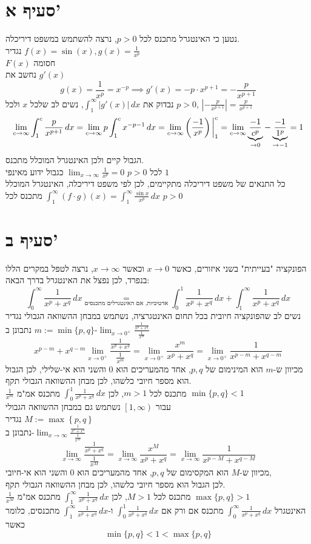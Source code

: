 \documentclass[12pt, titlepage]{article}
\begin{document}
\section*{סעיף א'}
נטען כי האינטגרל מתכנס לכל $p>0$, נרצה להשתמש במשפט דיריכלה.\\
נגדיר $f(x) = \sin(x), g(x) = \frac{1}{x^p}$\\
$F(x)$ חסומה\\
נחשב את $g'(x)$
\[
	g(x) = \frac{1}{x^{p}} = x^{-p} \implies g'(x) = -p\cdot x^{p+1} = -\frac{p}{x^{p+1}}
\]
נבדוק את $\int^\infty_1 \left|g'(x)\right|\,dx$, נשים לב שלכל $x$ ולכל $p>0$, $\left|-\frac{p}{x^{p+1}}\right| = \frac{p}{x^{p+1}}$
\[
	\lim_{c\to\infty} \int_1^c\frac{p}{x^{p+1}}\,dx = \lim_{c\to\infty} p \int^c_1 x^{-p-1} \,dx= \lim_{c\to\infty}  \left(\frac{-1}{x^{p}}\right)\bigg{|}^c_1 = \lim_{c\to\infty} \underbrace{\frac{-1}{c^p}}_{\to 0} - \underbrace{\frac{-1}{1^p}}_{\to -1} = 1
\]
הגבול קיים ולכן האינטגרל המוכלל מתכנס.\\
לכל $p>0$ $\lim_{x\to\infty}\frac{1}{x^{p}}=0$ כגבול ידוע מאינפי $1$\\
כל התנאים של משפט דיריכלה מתקיימים, לכן לפי משפט דיריכלה, האינטגרל המוכלל $\int^\infty_1(f\cdot g)(x)=\int^\infty_1 \frac{\sin x}{x^p}\,dx$ מתכנס לכל $\boxed{p>0}$
\section*{סעיף ב'}
הפונקציה "בעייתית" בשני איזורים, כאשר $x\to 0$ וכאשר $x\to \infty$, נרצה לטפל במקרים הללו בנפרד, לכן נפצל את האינטגרל בדרך הבאה:
\[
	\int_0^\infty \frac{1}{x^p+x^q}\,dx \underset{\text{אדטיביות, אם האינטגרלים מתכנסים}}{=}	\int_0^1 \frac{1}{x^p+x^q}\,dx + 	\int_1^\infty \frac{1}{x^p+x^q}\,dx
\]
נשים לב שהפונקציה חיובית בכל תחום האינטגרציה, נשתמש במבחן ההשוואה הגבולי
נגדיר $m:= \min\{p,q\}$
נתבונן ב-$\lim_{x\to 0^{+}} \frac{\frac{1}{x^p+x^q}}{\frac{1}{x^m}}$
\[
	x^{p-m} + x^{q-m}	\lim_{x\to0^{+}} \frac{\frac{1}{x^p+x^q}}{\frac{1}{x^m}} =\lim_{x\to0^{+}} \frac{x^m}{x^p+x^q} = \lim_{x\to0^+}\frac{1}{x^{p-m} + x^{q-m}}
\]
מכיוון ש-$m$ הוא המינימום של $p,q$, אחד מהמעריכים הוא $0$ והשני הוא אי-שלילי, לכן הגבול הוא מספר חיובי כלשהו, לכן מבחן ההשוואה הגבולי תקף.\\
$\frac{1}{x^m}$ מתכנס לכל $m>1$, לכן $\int_0^1 \frac{1}{x^p+x^q}\,dx$ מתכנס אמ"מ $\min\{p,q\}< 1$\\
עבור $\left[1,\infty\right)$ נשתמש גם במבחן ההשוואה הגבולי\\
נגדיר $M:=\max\left\{p,q\right\}$\\
נתבונן ב-$\lim_{x\to \infty} \frac{\frac{1}{x^p+x^q}}{\frac{1}{x^M}}$
\[
	\lim_{x\to \infty} \frac{\frac{1}{x^p+x^q}}{\frac{1}{x^M}} = \lim_{x\to\infty}\frac{x^M}{x^p+x^q} = \lim_{x\to\infty} \frac{1}{x^{p-M}+x^{q-M}}
\]
מכיוון ש-$M$ הוא המקסימום של $p,q$, אחד מהמעריכים הוא $0$ והשני הוא אי-חיובי,\\
לכן הגבול הוא מספר חיובי כלשהו, לכן מבחן ההשוואה הגבולי תקף.\\
$\frac{1}{x^M}$ מתכנס לכל $M>1$, לכן $\int_1^\infty \frac{1}{x^p+x^q}\,dx$ מתכנס אמ"מ $\max\{p,q\} > 1$\\
האינטגרל $\int_0^\infty \frac{1}{x^p+x^q}\,dx$ מתכנס אם ורק אם $\int_0^1 \frac{1}{x^p+x^q}\,dx $ ו-$\int_1^\infty \frac{1}{x^p+x^q}\,dx$ מתכנסים, כלומר כאשר
\[
	\boxed{\min\{p,q\} < 1 < \max\{p,q\}}
\]
\end{document}

